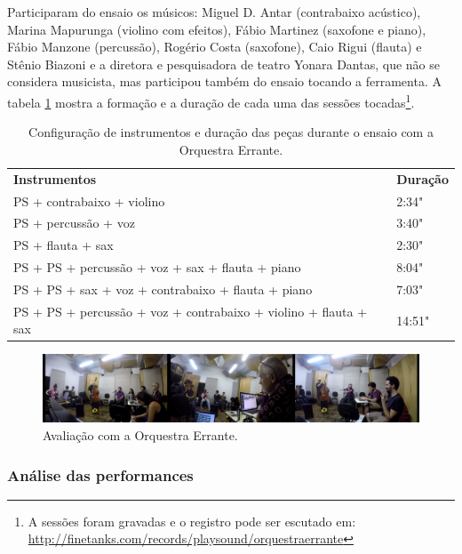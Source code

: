 Participaram do ensaio os músicos: Miguel D. Antar (contrabaixo acústico), Marina Mapurunga (violino com efeitos), Fábio Martinez (saxofone e piano), Fábio Manzone (percussão), Rogério Costa (saxofone), Caio Rigui (flauta) e Stênio Biazoni e a diretora e pesquisadora de teatro Yonara Dantas, que não se considera musicista, mas participou também do ensaio tocando a ferramenta. A tabela \ref{tab:orchestra} mostra a formação e a duração de cada uma das sessões tocadas\footnote{A sessões foram gravadas e o registro pode ser escutado em: \url{http://finetanks.com/records/playsound/orquestraerrante}}.  

\begin{table}[ht]
\caption{Configuração de instrumentos e duração das peças durante o ensaio com a Orquestra Errante.}
\begin{tabular}{ll}
\textbf{Instrumentos}                                                    & \textbf{Duração} \\
PS + contrabaixo + violino                                & 2:34"         \\
PS + percussão + voz                                                 & 3:40"         \\
PS + flauta + sax                                                        & 2:30"         \\
PS + PS + percussão + voz + sax + flauta + piano                      & 8:04"         \\
PS + PS + sax + voz + contrabaixo + flauta + piano                   & 7:03"         \\
PS + PS + percussão + voz + contrabaixo + violino + flauta + sax & 14:51"       
\end{tabular}
\label{tab:orchestra}
\end{table}



\begin{figure}

\includegraphics[width=1\textwidth]{pictures/cap4/orquestra_errante_usertest}
\caption{\label{psorquestra}Avaliação com a Orquestra Errante.}
\label{fig:psorquestra}
\end{figure}

\subsubsection{Análise das performances}

